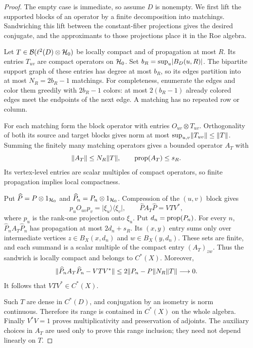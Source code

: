 \begin{proof}
The empty case is immediate, so assume $D$ is nonempty. We first lift the
supported blocks of an operator by a finite decomposition into matchings.
Sandwiching this lift between the constant-fiber projections gives the
desired conjugate, and the approximants to those projections place it in
the Roe algebra.

Let $T\in\mathcal B(\ell^2(D)\otimes\mathcal H_0)$ be locally compact and of
propagation at most $R$. Its entries $T_{uv}$ are compact operators on
$\mathcal H_0$. Set $b_R=\sup_u\lvert B_D(u,R)\rvert$. The bipartite support graph of
these entries has degree at most $b_R$, so its edges partition into at most
$N_R=2b_R-1$ matchings. For completeness, enumerate the edges and color
them greedily with $2b_R-1$ colors: at most $2(b_R-1)$ already colored
edges meet the endpoints of the next edge. A matching has no repeated row
or column.

For each matching form the block operator with entries
$O_{uv}\otimes T_{uv}$. Orthogonality of both its source and target blocks
gives norm at most $\sup_{u,v}\lVert T_{uv}\rVert\le\lVert T\rVert$. Summing the
finitely many matching operators gives a bounded operator $A_T$ with
\begin{equation}\label{eq:matchingnorm}
 \lVert A_T\rVert\le N_R\lVert T\rVert,\qquad \operatorname{prop}(A_T)\le s_R.
\end{equation}
Its vertex-level entries are scalar multiples of compact operators, so
finite propagation implies local compactness.

Put $\widehat P=P\otimes1_{\mathcal H_0}$ and
$\widehat P_n=P_n\otimes1_{\mathcal H_0}$. Compression of the $(u,v)$ block gives
\[
 p_u O_{uv}p_v=\lvert\xi_u\rangle\langle\xi_v\rvert,
 \qquad \widehat P A_T\widehat P=VTV^*,
\]
where $p_u$ is the rank-one projection onto $\xi_u$. Put
$d_n=\operatorname{prop}(P_n)$. For every $n$,
$\widehat P_n A_T\widehat P_n$ has propagation at most $2d_n+s_R$.
Its $(x,y)$ entry sums only over intermediate vertices
$z\in B_X(x,d_n)$ and $w\in B_X(y,d_n)$. These sets are finite, and
each summand is a scalar multiple of the compact entry $(A_T)_{zw}$.
Thus the sandwich is locally compact and belongs to $C^*(X)$. Moreover,
\begin{equation}\label{eq:sandwich}
 \lVert \widehat P_n A_T\widehat P_n-VTV^*\rVert
 \le 2\lVert P_n-P\rVert N_R\lVert T\rVert\longrightarrow0.
\end{equation}
It follows that $VTV^*\in C^*(X)$.

Such $T$ are dense in $C^*(D)$, and conjugation by an isometry is norm
continuous. Therefore its range is contained in $C^*(X)$ on the whole
algebra. Finally $V^*V=1$ proves multiplicativity and preservation of
adjoints. The auxiliary choices in $A_T$ are used only to prove this range
inclusion; they need not depend linearly on $T$.
\end{proof}

